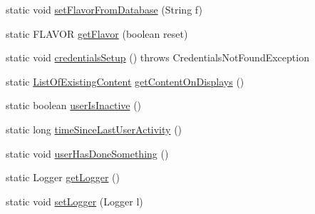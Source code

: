 \begin{DoxyCompactItemize}
\item 
static void \hyperlink{classgov_1_1fnal_1_1ppd_1_1dd_1_1GlobalVariables_a199ba3417f9d46d69c2083e3c782d85e}{set\-Flavor\-From\-Database} (String f)
\item 
static F\-L\-A\-V\-O\-R \hyperlink{classgov_1_1fnal_1_1ppd_1_1dd_1_1GlobalVariables_a43d1f44dce5ac77b0d03e3c58a8f9533}{get\-Flavor} (boolean reset)
\item 
static void \hyperlink{classgov_1_1fnal_1_1ppd_1_1dd_1_1GlobalVariables_a3beb933e8664bc5cf625f37d4e0ad429}{credentials\-Setup} ()  throws Credentials\-Not\-Found\-Exception 
\item 
static \hyperlink{classgov_1_1fnal_1_1ppd_1_1dd_1_1changer_1_1ListOfExistingContent}{List\-Of\-Existing\-Content} \hyperlink{classgov_1_1fnal_1_1ppd_1_1dd_1_1GlobalVariables_a5dee2a221fa2d94a5baa8558800845e3}{get\-Content\-On\-Displays} ()
\item 
static boolean \hyperlink{classgov_1_1fnal_1_1ppd_1_1dd_1_1GlobalVariables_aba515ddabffe804f9830689e02ef0cda}{user\-Is\-Inactive} ()
\item 
static long \hyperlink{classgov_1_1fnal_1_1ppd_1_1dd_1_1GlobalVariables_a7480064c523e0ebb558122616d32544f}{time\-Since\-Last\-User\-Activity} ()
\item 
static void \hyperlink{classgov_1_1fnal_1_1ppd_1_1dd_1_1GlobalVariables_a526d778baf99fcb1eb1648e91c5e346d}{user\-Has\-Done\-Something} ()
\item 
static Logger \hyperlink{classgov_1_1fnal_1_1ppd_1_1dd_1_1GlobalVariables_a5f0114f559702931f77f0e571be95752}{get\-Logger} ()
\item 
static void \hyperlink{classgov_1_1fnal_1_1ppd_1_1dd_1_1GlobalVariables_a14e776ad97d0c10931fd61205c9d2b6f}{set\-Logger} (Logger l)
\end{DoxyCompactItemize}
